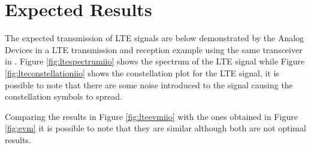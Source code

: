 \vfill
\clearpage

\section{Expected Results}
\label{result:optimum}

The expected transmission of LTE signals are below demonstrated by the Analog
Devices in a LTE transmission and reception example using the same transceiver
in \cite{web:lteexamplewiki}. Figure \ref{fig:ltespectrumiio} shows the spectrum
of the LTE signal while Figure \ref{fig:lteconstellationiio}  shows the
constellation plot for the LTE signal, it is possible to note that there are
some noise introduced to the signal causing the constellation symbols to spread.

Comparing the results in Figure \ref{fig:lteevmiio} with the ones obtained in
Figure \ref{fig:evm} it is possible to note that they are similar although both
are not optimal results.



